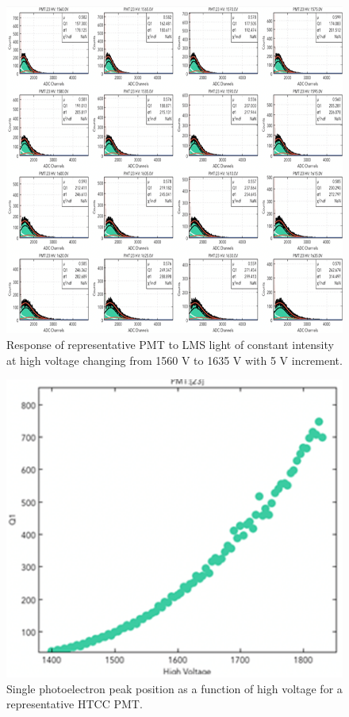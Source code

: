 \begin{figure}[ht]
\centering
\includegraphics[width=0.99\linewidth]{images/WILLIAM_2.png}
\caption{Response of representative PMT to LMS light of constant intensity at high voltage changing from 1560 V to 1635 V with 5 V increment.}
\label{fig:WILLIAM_2}
\end{figure}

\begin{figure}[ht]
\centering
\includegraphics[width=0.99\linewidth]{images/WILLIAM_3.png}
\caption{Single photoelectron peak position as a function of high voltage for a representative HTCC PMT.}
\label{fig:WILLIAM_3}
\end{figure}

